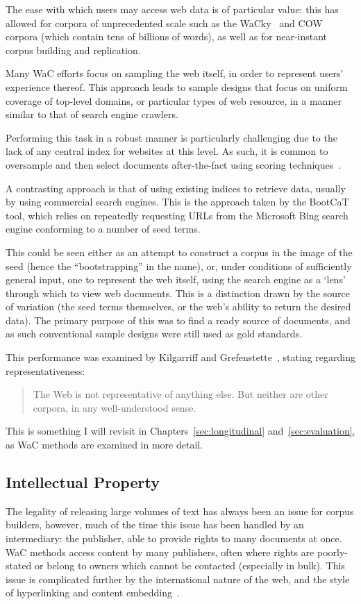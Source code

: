 The ease with which users may access web data is of particular value: this has allowed for corpora of unprecedented scale such as the WaCky~\cite{baroni2009wacky} and COW~\cite{schafer2012building} corpora (which contain tens of billions of words), as well as for near-instant corpus building and replication.

Many WaC efforts focus on sampling the web itself, in order to represent users' experience thereof.  This approach leads to sample designs that focus on uniform coverage of top-level domains, or particular types of web resource, in a manner similar to that of search engine crawlers.

Performing this task in a robust manner is particularly challenging due to the lack of any central index for websites at this level.  As such, it is common to oversample and then select documents after-the-fact using scoring techniques~\cite{schafer2013web,schafer2014focused}.

A contrasting approach is that of using existing indices to retrieve data, usually by using commercial search engines.  This is the approach taken by the BootCaT tool, which relies on repeatedly requesting URLs from the Microsoft Bing search engine conforming to a number of seed terms.

This could be seen either as an attempt to construct a corpus in the image of the seed (hence the ``bootstrapping'' in the name), or, under conditions of sufficiently general input, one to represent the web itself, using the search engine as a `lens' through which to view web documents.  This is a distinction drawn by the source of variation (the seed terms themselves, or the web's ability to return the desired data).  The primary purpose of this was to find a ready source of documents, and as such conventional sample designs were still used as gold standards.

This performance was examined by Kilgarriff and Grefenstette~\cite[p. 343]{kilgarriff2003introduction}, stating regarding representativeness:

\begin{quote}
The Web is not representative of anything else. But neither are other corpora, in any
well-understood sense.
\end{quote}

This is something I will revisit in Chapters~\ref{sec:longitudinal} and~\ref{sec:evaluation}, as WaC methods are examined in more detail.


\subsection{Intellectual Property}
The legality of releasing large volumes of text has always been an issue for corpus builders, however, much of the time this issue has been handled by an intermediary: the publisher, able to provide rights to many documents at once.  WaC methods access content by many publishers, often where rights are poorly-stated or belong to owners which cannot be contacted (especially in bulk).  This issue is complicated further by the international nature of the web, and the style of hyperlinking and content embedding~\cite{hemming2010copyright}.  

